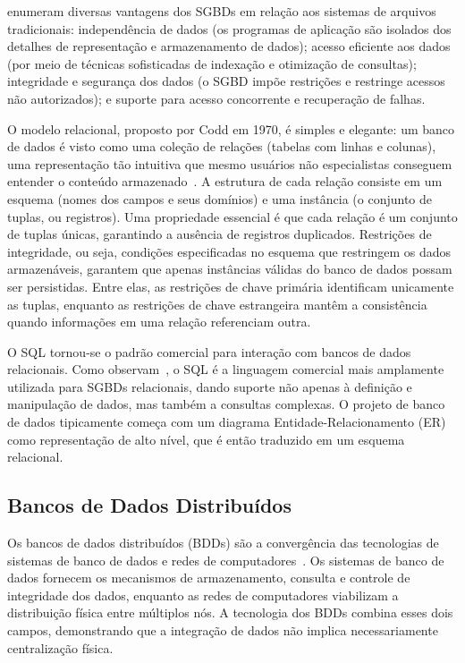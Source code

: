 \cite{Ramakrishnan2003} enumeram diversas vantagens dos SGBDs em relação aos sistemas de arquivos
tradicionais: independência de dados (os programas de aplicação são isolados dos detalhes de
representação e armazenamento de dados); acesso eficiente aos dados (por meio de técnicas
sofisticadas de indexação e otimização de consultas); integridade e segurança dos dados (o SGBD
impõe restrições e restringe acessos não autorizados); e suporte para acesso concorrente e
recuperação de falhas.

O modelo relacional, proposto por Codd em 1970, é simples e elegante: um banco de dados é visto
como uma coleção de relações (tabelas com linhas e colunas), uma representação tão intuitiva
que mesmo usuários não especialistas conseguem entender o conteúdo armazenado~\citep{Ramakrishnan2003}.
A estrutura de cada relação consiste em um esquema (nomes dos campos e seus domínios) e uma
instância (o conjunto de tuplas, ou registros). Uma propriedade essencial é que cada relação é
um conjunto de tuplas únicas, garantindo a ausência de registros duplicados. Restrições de
integridade, ou seja, condições especificadas no esquema que restringem os dados armazenáveis,
garantem que apenas instâncias válidas do banco de dados possam ser persistidas. Entre elas,
as restrições de chave primária identificam unicamente as tuplas, enquanto as restrições de
chave estrangeira mantêm a consistência quando informações em uma relação referenciam outra.

O SQL tornou-se o padrão comercial para interação com bancos de dados relacionais.
Como observam~\cite{Ramakrishnan2003}, o SQL é a linguagem comercial mais amplamente utilizada
para SGBDs relacionais, dando suporte não apenas à definição e manipulação de dados, mas também
a consultas complexas. O projeto de banco de dados tipicamente começa com um diagrama
Entidade-Relacionamento (ER) como representação de alto nível, que é então traduzido em um
esquema relacional.

\subsection{Bancos de Dados Distribuídos}

Os bancos de dados distribuídos (BDDs) são a convergência das tecnologias de sistemas de
banco de dados e redes de computadores~\citep{Ozsu2011}.
Os sistemas de banco de dados fornecem os mecanismos de armazenamento, consulta e controle
de integridade dos dados, enquanto as redes de computadores viabilizam a distribuição física
entre múltiplos nós. A tecnologia dos BDDs combina esses dois campos, demonstrando que a
integração de dados não implica necessariamente centralização física.

